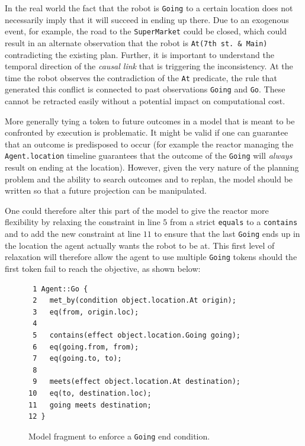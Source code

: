 In the real world the fact that the robot is \texttt{Going} to a
certain location does not necessarily imply that it will succeed in
ending up there. Due to an exogenous event, for example, the road to
the \texttt{SuperMarket} could be closed, which could result in an
alternate observation that the robot is \texttt{At(7th st. \& Main)}
contradicting the existing plan. Further, it is important to
understand the temporal direction of the \emph{causal link} that is
triggering the inconsistency. At the time the robot observes the
contradiction of the \texttt{At} predicate, the rule that generated
this conflict is connected to past observations \texttt{Going} and
\texttt{Go}. These cannot be retracted easily without a potential
impact on computational cost.

More generally tying a token to future outcomes in a model that is
meant to be confronted by execution is problematic. It might be valid
if one can guarantee that an outcome is predisposed to occur (for
example the reactor managing the \texttt{Agent.location} timeline
guarantees that the outcome of the \texttt{Going} will {\em always}
result on ending at the  location). However, given
the very nature of the planning problem and the ability to search
outcomes and to replan, the model should be written so that a future
projection can be manipulated.

One could therefore alter this part of the model to give the reactor
more flexibility by relaxing the constraint in line $5$ from a strict
\texttt{equals} to a \texttt{contains} and to add the new constraint
at line $11$ to ensure that the last \texttt{Going} ends up in the
location the agent actually wants the robot to be at. This first level
of relaxation will therefore allow the agent to use multiple
\texttt{Going} tokens should the first token fail to reach the
objective, as shown below:

\begin{figure}[tbp]
\begin{verbatim}
 1 Agent::Go {
 2   met_by(condition object.location.At origin);
 3   eq(from, origin.loc);
 4
 5   contains(effect object.location.Going going);
 6   eq(going.from, from);
 7   eq(going.to, to);
 8   
 9   meets(effect object.location.At destination);
10   eq(to, destination.loc);
11   going meets destination;
12 }
\end{verbatim}
\caption{\small Model fragment to enforce a \texttt{Going} end condition.}
\label{lab:model:shopping}
\end{figure}

